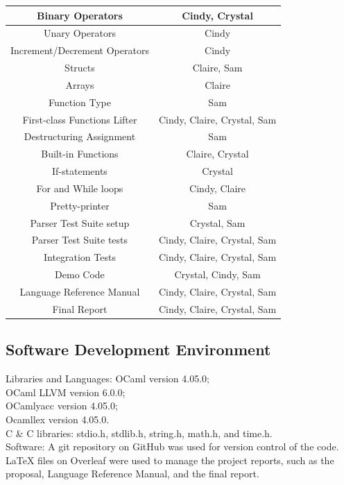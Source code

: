 \documentclass[12pt]{article}
\begin{document}
\begin{center}
\begin{tabular}{| c | c | }
   \hline
   Binary Operators & Cindy, Crystal \\
  \hline
   Unary Operators & Cindy \\
  \hline
Increment/Decrement Operators & Cindy \\
  \hline
   Structs & Claire, Sam \\
  \hline
  Arrays & Claire \\
  \hline
    Function Type & Sam \\
  \hline
    First-class Functions Lifter & Cindy, Claire, Crystal, Sam \\
  \hline
    Destructuring Assignment & Sam \\
  \hline
    Built-in Functions & Claire, Crystal \\
  \hline
    If-statements & Crystal \\
  \hline
    For and While loops & Cindy, Claire \\
  \hline
    Pretty-printer & Sam \\
  \hline
    Parser Test Suite setup & Crystal, Sam \\
  \hline
    Parser Test Suite tests & Cindy, Claire, Crystal, Sam \\
  \hline
    Integration Tests & Cindy, Claire, Crystal, Sam \\
  \hline
    Demo Code & Crystal, Cindy, Sam \\
  \hline
    Language Reference Manual & Cindy, Claire, Crystal, Sam \\
  \hline
    Final Report & Cindy, Claire, Crystal, Sam \\
  \hline
\end{tabular}
\end{center}

\subsection{Software Development Environment}
Libraries and Languages:
OCaml version 4.05.0; \\
OCaml LLVM version 6.0.0;\\
OCamlyacc version 4.05.0;\\
Ocamllex version 4.05.0.\\
C \& C libraries: stdio.h, stdlib.h, string.h, math.h, and time.h. \\

Software: A git repository on GitHub was used for version control of the code. LaTeX files on Overleaf were used to manage the project reports, such as the proposal, Language Reference Manual, and the final report. 
\end{document}
